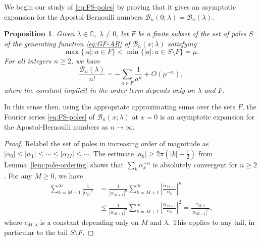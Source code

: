 \documentclass[11pt,a4paper]{amsart}
\newcommand{\Z}{\mathbb{Z}}
\newcommand{\C}{\mathbb{C}}
\newcommand{\B}{\mathcal{B}}
\theoremstyle{plain}
\newtheorem{prop}[theorem]{Proposition}
\theoremstyle{remark}
\begin{document}
We begin our study of \eqref{eq:FS-poles} by proving that it gives an asymptotic expansion for the Apostol-Bernoulli numbers $\B_{n}(0;\lambda) = \B_{n}(\lambda)$. 

\begin{prop}
\label{prop:approx-ABN}
Given $\lambda \in \C$, $\lambda \neq 0$, let $F$ be a finite subset of the set of poles $S$ of the generating function \eqref{eq:GF-AB} of $\B_{n}(x;\lambda)$ satisfying
$$
	\max\{ |a| : a \in F \} < \min\{ |a| : a \in S \setminus F \} = \mu.
$$
For all integers $n \geq 2$, we have
%
\begin{equation}
\label{eq:approx-ABN}
	\frac{\B_{n}(\lambda)}{n!} = -\sum_{a \in F} \frac{1}{a^{n}} + O(\mu^{-n}),
\end{equation}
%
where the constant implicit in the order term depends only on $\lambda$ and $F$.
\end{prop}

In this sense then, using the appropriate approximating sums over the sets $F$, the Fourier series \eqref{eq:FS-poles} of $\B_{n}(x;\lambda)$ at $x=0$ is an asymptotic expansion for the Apostol-Bernoulli numbers as $n \to \infty$.

\begin{proof}
Relabel the set of poles in increasing order of magnitude as
$|\alpha_{0}| \leq |\alpha_{1}| \leq \cdots \leq |\alpha_{M}| \leq \cdots$.
The estimate $|a_{k}| \geq 2\pi(|k|-\frac{1}{2})$ from Lemma~\ref{lem:pole-ordering}
shows that $\sum_{k} \alpha_{k}^{-n}$ is absolutely convergent for $n \geq 2$. For any $M \geq 0$, we have
$$
\begin{aligned}
	   	  \sum_{k = M+1}^{\infty} \frac{1}{|\alpha_{k}|^{n}}
	&=    \frac{1}{|\alpha_{M+1}|^{n}} 
	      \sum_{k = M+1}^{\infty} \left| \frac{\alpha_{M+1}}{\alpha_{k}}\right|^{n}
	\\
	&\leq \frac{1}{|\alpha_{M+1}|^{n}} 
	      \sum_{k = M+1}^{\infty} \left| \frac{\alpha_{M+1}}{\alpha_{k}}\right|^{2}
	=     \frac{c_{M,\lambda}}{|\alpha_{M+1}|^{n}}, 
\end{aligned}$$
where $c_{M,\lambda}$ is a constant depending only on $M$ and $\lambda$. This applies to any tail, in particular to the tail $S \setminus F$.
\end{proof}
\end{document}
